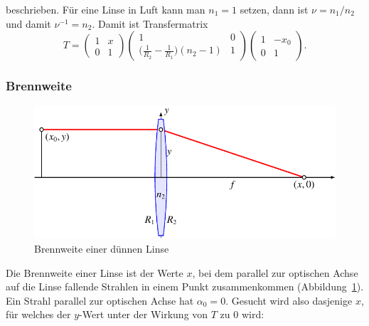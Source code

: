 beschrieben.
Für eine Linse in Luft kann man $n_1=1$ setzen, dann ist $\nu=n_1/n_2$
und damit $\nu^{-1}=n_2$.
Damit ist Transfermatrix
\[
T
=
\begin{pmatrix}
1&x\\
0&1
\end{pmatrix}
\begin{pmatrix}
1&0\\
\displaystyle
\biggl(\frac1{R_2}-\frac1{R_1}\biggr)(n_2-1)
&1
\end{pmatrix}
\begin{pmatrix}
1&-x_0\\
0&1
\end{pmatrix}.
\]

\subsubsection{Brennweite}
\begin{figure}
\centering
\includegraphics{applications/matrixoptik/fl.pdf}
\caption{Brennweite einer dünnen Linse
\label{mo:focus}}
\end{figure}
Die Brennweite einer Linse ist der Werte $x$, bei dem parallel zur
optischen Achse auf die Linse fallende Strahlen in einem Punkt
zusammenkommen (Abbildung~\ref{mo:focus}).
Ein Strahl parallel zur optischen Achse hat $\alpha_0=0$.
Gesucht wird also dasjenige $x$, für welches der $y$-Wert unter der
Wirkung von $T$ zu $0$ wird:
